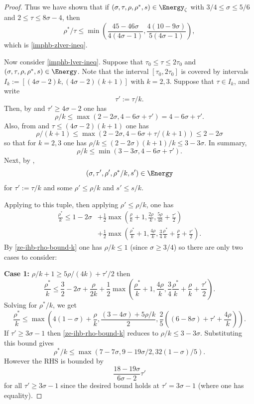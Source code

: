 \begin{proof}
Thus we have shown that if $(\sigma, \tau, \rho, \rho^*, s) \in \Energy_\zeta$ with $3/4 \le \sigma \le 5/6$ and $2 \le \tau \le 8\sigma - 4$, then
\[
\rho^*/\tau \le \min\left(\frac{45 - 46\sigma}{4(4\sigma - 1)}, \frac{4(10 - 9\sigma)}{5(4\sigma - 1)}\right),
\]
which is \eqref{imphb-zlver-ineq}.

Now consider \eqref{imphb-lver-ineq}. Suppose that $\tau_0 \le \tau \le 2\tau_0$ and $(\sigma, \tau, \rho, \rho^*, s) \in \Energy$. Note that the interval $[\tau_0, 2\tau_0]$ is covered by intervals $I_k := [(4\sigma - 2)k, (4\sigma - 2)(k + 1)]$ with $k = 2, 3$. Suppose that $\tau \in I_k$, and write
\[
\tau' := \tau/k.
\]
Then, by  and $\tau' \ge 4\sigma - 2$ one has
\[
\rho/k \le \max(2 - 2\sigma, 4 - 6\sigma + \tau') = 4 - 6\sigma + \tau'.
\]
Also, from  and $\tau \le (4\sigma - 2)(k + 1)$ one has
\[
\rho/(k + 1) \le \max(2 - 2\sigma, 4 - 6\sigma + \tau/(k + 1)) \le 2 - 2\sigma
\]
so that for $k = 2,3$ one has $\rho/k \le (2 - 2\sigma)(k + 1)/k \le 3 - 3\sigma$.
In summary,
\begin{equation}\label{ze-ihb-rho-bound-k}
\rho/k \le \min(3 - 3\sigma, 4 - 6\sigma + \tau').
\end{equation}
Next, by ,
\[
(\sigma, \tau', \rho', \rho^*/k, s') \in \Energy
\]
for $\tau' := \tau/k$ and some $\rho' \le \rho/k$ and $s' \le s/k$.

Applying  to this tuple, then applying $\rho' \le \rho/k$, one has
\begin{align*}
\frac{\rho^*}{k} \leq 1-2\sigma &+ \frac{1}{2}\max\left(\frac{\rho}{k}+1, \frac{2\rho}{k}, \frac{5\rho}{4k} + \frac{\tau'}{2}\right) \\
&+ \frac{1}{2}\max\left(\frac{\rho^*}{k}+1, \frac{4\rho}{k}, \frac{3}{4}\frac{\rho^*}{k} +\frac{\rho}{k}+\frac{\tau'}{2}\right).
\end{align*}
By \eqref{ze-ihb-rho-bound-k} one has $\rho/k \le 1$ (since $\sigma \ge 3/4$) so there are only two cases to consider:

\textbf{Case 1:} $\rho/k + 1 \ge 5\rho/(4k) + \tau'/2$ then
\[
\frac{\rho^*}{k} \le \frac{3}{2} - 2\sigma + \frac{\rho}{2k} + \frac{1}{2}\max\left(\frac{\rho^*}{k}+1, \frac{4\rho}{k}, \frac{3}{4}\frac{\rho^*}{k} +\frac{\rho}{k}+\frac{\tau'}{2}\right).
\]
Solving for $\rho^*/k$, we get
\[
\frac{\rho^*}{k} \le \max\left(4(1 - \sigma) + \frac{\rho}{k}, \frac{(3 - 4\sigma) + 5\rho/k}{2}, \frac{2}{5}((6 - 8\sigma) + \tau' + \frac{4\rho}{k})\right).
\]
If $\tau' \ge 3\sigma - 1$ then \eqref{ze-ihb-rho-bound-k} reduces to $\rho/k \le 3-3\sigma$. Substituting this bound gives
\[
\rho^*/k \le \max(7 - 7\sigma, 9 - 19\sigma/2, 32(1 - \sigma)/5).
\]
However the RHS is bounded by
\begin{equation}\label{ze-ihb-rho-1}
\frac{18 - 19\sigma}{6\sigma - 2}\tau'
\end{equation}
for all $\tau' \ge 3\sigma - 1$ since the desired bound holds at $\tau' = 3\sigma - 1$ (where one has equality).


\end{proof}
